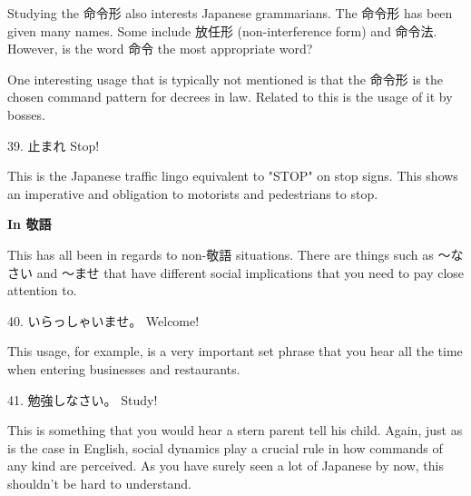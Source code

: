 \par{ Studying the 命令形 also interests Japanese grammarians. The 命令形 has been given many names. Some include 放任形 (non-interference form) and 命令法. However, is the word 命令 the most appropriate word? }

\par{ One interesting usage that is typically not mentioned is that the 命令形 is the chosen command pattern for decrees in law. Related to this is the usage of it by bosses. }

\par{39. 止まれ \hfill\break
Stop! }

\par{ This is the Japanese traffic lingo equivalent to "STOP" on stop signs. This shows an imperative and obligation to motorists and pedestrians to stop. }

\begin{center}
 \textbf{In 敬語 }
\end{center}

\par{ This has all been in regards to non-敬語 situations. There are things such as ～なさい and ～ませ that have different social implications that you need to pay close attention to. }

\par{40. いらっしゃいませ。 \hfill\break
Welcome! }

\par{ This usage, for example, is a very important set phrase that you hear all the time when entering businesses and restaurants. }

\par{41. 勉強しなさい。 \hfill\break
Study! }

\par{ This is something that you would hear a stern parent tell his child. Again, just as is the case in English, social dynamics play a crucial rule in how commands of any kind are perceived. As you have surely seen a lot of Japanese by now, this shouldn't be hard to understand. }
    